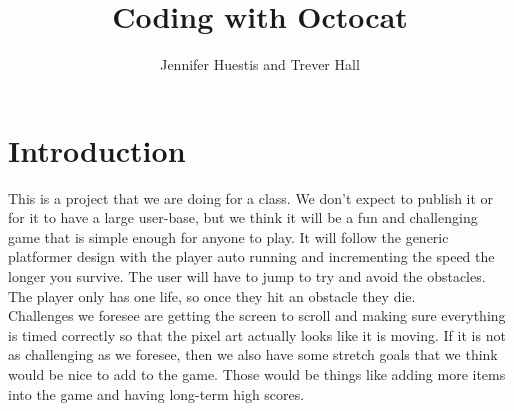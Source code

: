 \documentclass[10pt,conference,onecolumn,compsoc]{IEEEtran}
\begin{document}
\title{Coding with Octocat}
%
%


\author{Jennifer Huestis and Trever Hall%
}



\maketitle



\IEEEdisplaynontitleabstractindextext

\IEEEpeerreviewmaketitle



\section{Introduction}

This is a project that we are doing for a class. We don't expect to publish it or for it to have a large user-base, but we think it will be a fun and challenging game that is simple enough for anyone to play. It will follow the generic platformer design with the player auto running and incrementing the speed the longer you survive. The user will have to jump to try and avoid the obstacles. The player only has one life, so once they hit an obstacle they die.
\\

Challenges we foresee are getting the screen to scroll and making sure everything is timed correctly so that the pixel art actually looks like it is moving. If it is not as challenging as we foresee, then we also have some stretch goals that we think would be nice to add to the game. Those would be things like adding more items into the game and having long-term high scores.
\end{document}
